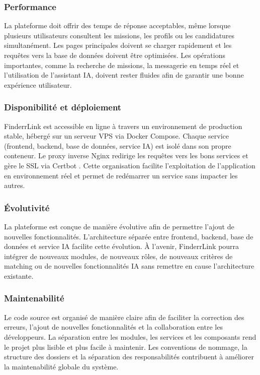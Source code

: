 \subsubsection{Performance}

La plateforme doit offrir des temps de réponse acceptables, même lorsque plusieurs utilisateurs consultent les missions, les profils ou les candidatures simultanément. Les pages principales doivent se charger rapidement et les requêtes vers la base de données doivent être optimisées. Les opérations importantes, comme la recherche de missions, la messagerie en temps réel et l'utilisation de l'assistant IA, doivent rester fluides afin de garantir une bonne expérience utilisateur.

\subsubsection{Disponibilité et déploiement}

FinderrLink est accessible en ligne à travers un environnement de production stable, hébergé sur un serveur VPS via Docker Compose. Chaque service (frontend, backend, base de données, service IA) est isolé dans son propre conteneur. Le proxy inverse Nginx redirige les requêtes vers les bons services et gère le SSL via Certbot \cite{certbot}. Cette organisation facilite l'exploitation de l'application en environnement réel et permet de redémarrer un service sans impacter les autres.

\subsubsection{Évolutivité}

La plateforme est conçue de manière évolutive afin de permettre l'ajout de nouvelles fonctionnalités. L'architecture séparée entre frontend, backend, base de données et service IA facilite cette évolution. À l'avenir, FinderrLink pourra intégrer de nouveaux modules, de nouveaux rôles, de nouveaux critères de matching ou de nouvelles fonctionnalités IA sans remettre en cause l'architecture existante.

\subsubsection{Maintenabilité}

Le code source est organisé de manière claire afin de faciliter la correction des erreurs, l'ajout de nouvelles fonctionnalités et la collaboration entre les développeurs. La séparation entre les modules, les services et les composants rend le projet plus lisible et plus facile à maintenir. Les conventions de nommage, la structure des dossiers et la séparation des responsabilités contribuent à améliorer la maintenabilité globale du système.

